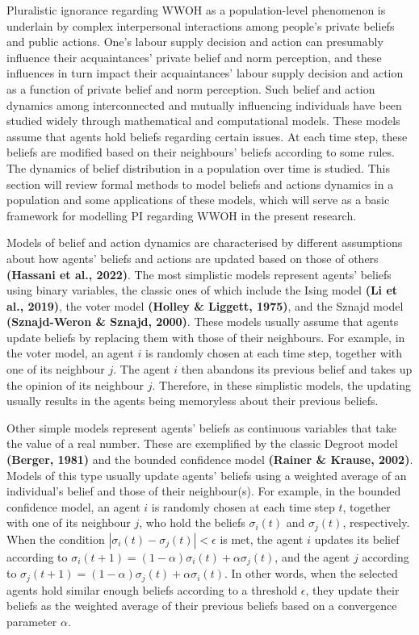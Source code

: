 \documentclass[
  11pt,
]{article}
\begin{document}
Pluralistic ignorance regarding WWOH as a population-level phenomenon is
underlain by complex interpersonal interactions among people's private
beliefs and public actions. One's labour supply decision and action can
presumably influence their acquaintances' private belief and norm
perception, and these influences in turn impact their acquaintances'
labour supply decision and action as a function of private belief and
norm perception. Such belief and action dynamics among interconnected
and mutually influencing individuals have been studied widely through
mathematical and computational models. These models assume that agents
hold beliefs regarding certain issues. At each time step, these beliefs
are modified based on their neighbours' beliefs according to some rules.
The dynamics of belief distribution in a population over time is
studied. This section will review formal methods to model beliefs and
actions dynamics in a population and some applications of these models,
which will serve as a basic framework for modelling PI regarding WWOH in
the present research.

Models of belief and action dynamics are characterised by different
assumptions about how agents' beliefs and actions are updated based on
those of others \textbf{(Hassani et al., 2022)}. The most simplistic
models represent agents' beliefs using binary variables, the classic
ones of which include the Ising model \textbf{(Li et al., 2019)}, the
voter model \textbf{(Holley \& Liggett, 1975)}, and the Sznajd model
\textbf{(Sznajd-Weron \& Sznajd, 2000)}. These models usually assume
that agents update beliefs by replacing them with those of their
neighbours. For example, in the voter model, an agent \(i\) is randomly
chosen at each time step, together with one of its neighbour \(j\). The
agent \(i\) then abandons its previous belief and takes up the opinion
of its neighbour \(j\). Therefore, in these simplistic models, the
updating usually results in the agents being memoryless about their
previous beliefs.

Other simple models represent agents' beliefs as continuous variables
that take the value of a real number. These are exemplified by the
classic Degroot model \textbf{(Berger, 1981)} and the bounded confidence
model \textbf{(Rainer \& Krause, 2002)}. Models of this type usually
update agents' beliefs using a weighted average of an individual's
belief and those of their neighbour(s). For example, in the bounded
confidence model, an agent \(i\) is randomly chosen at each time step
\(t\), together with one of its neighbour \(j\), who hold the beliefs
\(\sigma_i(t)\) and \(\sigma_j(t)\), respectively. When the condition
\(|\sigma_i(t) - \sigma_j(t)| < \epsilon\) is met, the agent \(i\)
updates its belief according to
\(\sigma_i(t+1) = (1 - \alpha)\sigma_i(t) + \alpha\sigma_j(t)\), and the
agent \(j\) according to
\(\sigma_j(t+1) = (1 - \alpha)\sigma_j(t) + \alpha\sigma_i(t)\). In
other words, when the selected agents hold similar enough beliefs
according to a threshold \(\epsilon\), they update their beliefs as the
weighted average of their previous beliefs based on a convergence
parameter \(\alpha\).
\end{document}
